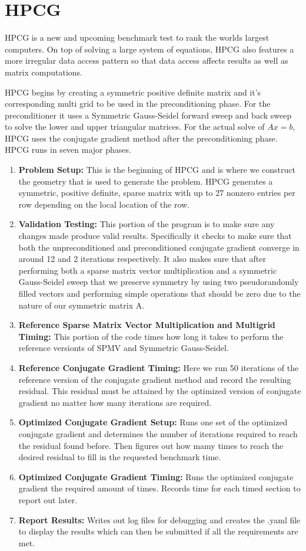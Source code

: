 \documentclass{ccr15}
\begin{document}


\section{HPCG}
HPCG is a new and
upcoming benchmark test to rank the worlds largest computers. On top
of solving a large system of equations, HPCG also features a more irregular data access pattern
so that data access affects results as well as matrix computations.

HPCG begins by creating a symmetric positive definite matrix and it's corresponding multi grid
to be used in the preconditioning phase. For the preconditioner it uses a Symmetric Gauss-Seidel
forward sweep and back sweep to solve the lower and upper triangular matrices. For the actual
solve of $A x = b$, HPCG uses the conjugate gradient method after the preconditioning phase.
HPCG runs in seven major phases.
\begin{enumerate}
\item \textbf{Problem Setup:} This is the beginning of HPCG and is where we construct the
geometry that is used to generate the problem. HPCG generates a symmetric, positive definite,
sparse matrix with up to 27 nonzero entries per row depending on the local location of the row.
\item \textbf{Validation Testing:} This portion of the program is to make sure any changes
made produce valid results. Specifically it checks to make sure that both the unpreconditioned
and preconditioned conjugate gradient converge in around 12 and 2 iterations respectively. It
also makes sure that after performing both a sparse matrix vector multiplication and a symmetric
Gauss-Seidel sweep that we preserve symmetry by using two pseudorandomly filled vectors and
performing simple operations that should be zero due to the nature of our symmetric matrix A.
\item \textbf{Reference Sparse Matrix Vector Multiplication and Multigrid Timing:} This
portion of the code times how long it takes to perform the reference versionts of SPMV and
Symmetric Gauss-Seidel.
\item \textbf{Reference Conjugate Gradient Timing:} Here we run 50 iterations of the reference
version of the conjugate gradient method and record the resulting residual. This residual must be
attained by the optimized version of conjugate gradient no matter how many iterations are
required.
\item \textbf{Optimized Conjugate Gradient Setup:} Runs one set of the optimized conjugate
gradient and determines the number of iterations required to reach the residual found before.
Then figures out how mamy times to reach the desired residual to fill in the requested benchmark
time.
\item \textbf{Optimized Conjugate Gradient Timing:} Runs the optimized conjugate gradient the
required amount of times. Records time for each timed section to report out later.
\item \textbf{Report Results:} Writes out log files for debugging and creates the .yaml file
to display the results which can then be submitted if all the requirements are met.
\end{enumerate}
\end{document}

